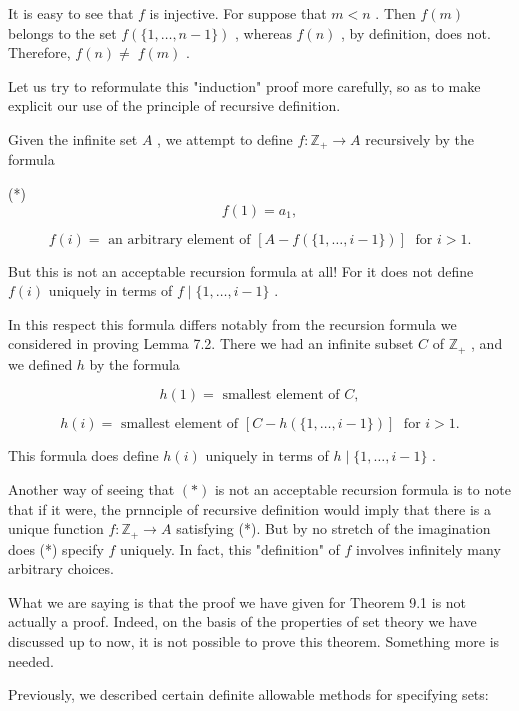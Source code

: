 \documentclass[10pt]{article}
\begin{document}
It is easy to see that \(f\) is injective. For suppose that \(m < n\) . Then \(f\left( m\right)\) belongs to the set \(f\left( {\{ 1,\ldots ,n - 1\} }\right)\) , whereas \(f\left( n\right)\) , by definition, does not. Therefore, \(f\left( n\right)  \neq \; f\left( m\right)\) .

Let us try to reformulate this "induction" proof more carefully, so as to make explicit our use of the principle of recursive definition.

Given the infinite set \(A\) , we attempt to define \(f : {\mathbb{Z}}_{ + } \rightarrow  A\) recursively by the formula

(*)
\[
f\left( 1\right)  = {a}_{1},
\]

\[
f\left( i\right)  = \text{ an arbitrary element of }\left\lbrack  {A - f\left( {\{ 1,\ldots ,i - 1\} }\right) }\right\rbrack  \;\text{ for }i > 1.
\]

But this is not an acceptable recursion formula at all! For it does not define \(f\left( i\right)\) uniquely in terms of \(f \mid  \{ 1,\ldots ,i - 1\}\) .

In this respect this formula differs notably from the recursion formula we considered in proving Lemma 7.2. There we had an infinite subset \(C\) of \({\mathbb{Z}}_{ + }\) , and we defined \(h\) by the formula

\[
h\left( 1\right)  = \text{ smallest element of }C,
\]

\[
h\left( i\right)  = \text{ smallest element of }\left\lbrack  {C - h\left( {\{ 1,\ldots ,i - 1\} }\right) }\right\rbrack  \;\text{ for }i > 1.
\]

This formula does define \(h\left( i\right)\) uniquely in terms of \(h \mid  \{ 1,\ldots ,i - 1\}\) .

Another way of seeing that \(\left( *\right)\) is not an acceptable recursion formula is to note that if it were, the prnnciple of recursive definition would imply that there is a unique function \(f : {\mathbb{Z}}_{ + } \rightarrow  A\) satisfying (*). But by no stretch of the imagination does (*) specify \(f\) uniquely. In fact, this "definition" of \(f\) involves infinitely many arbitrary choices.

What we are saying is that the proof we have given for Theorem 9.1 is not actually a proof. Indeed, on the basis of the properties of set theory we have discussed up to now, it is not possible to prove this theorem. Something more is needed.

Previously, we described certain definite allowable methods for specifying sets:
\end{document}
